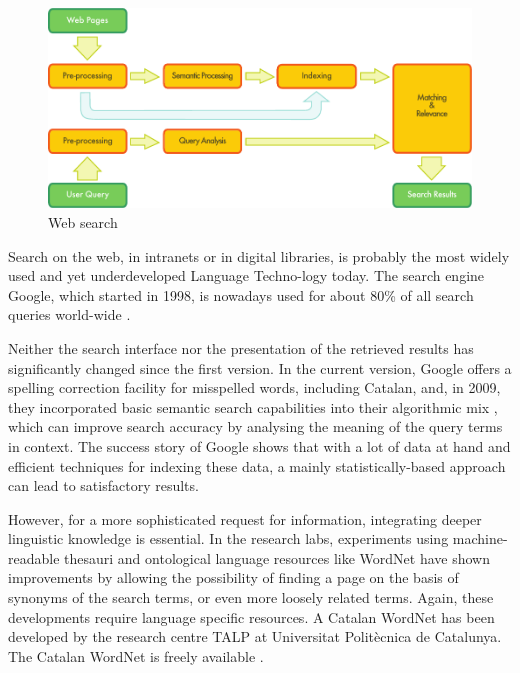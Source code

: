 \documentclass[]{../../metanetpaper}
\begin{document}
\begin{multicols}{2}
\begin{figure}[htb]
  \center
  \includegraphics[width=\textwidth]{../_media/english/web_search_architecture}
  \caption{Web search}
  \label{fig:websearcharch_en}
 \end{figure}

Search on the web, in intranets or in digital libraries, is probably the most widely used and yet underdeveloped Language Techno-logy today. The search engine Google, which started in 1998, is nowadays used for about 80\% of all search queries world-wide \cite{CAT-Nota22}. 

Neither the search interface nor the presentation of the retrieved results has significantly changed since the first version. In the current version, Google offers a spelling correction facility for misspelled words, including Catalan, and, in 2009, they incorporated basic semantic search capabilities into their algorithmic mix \cite{CAT-Nota23}, which can improve search accuracy by analysing the meaning of the query terms in context. The success story of Google shows that with a lot of data at hand and efficient techniques for indexing these data, a mainly statistically-based approach can lead to satisfactory results. 

However, for a more sophisticated request for information, integrating deeper linguistic knowledge is essential. In the research labs, experiments using machine-readable thesauri and ontological language resources like WordNet have shown improvements by allowing the possibility of finding a page on the basis of synonyms of the search terms, or even more loosely related terms. Again, these developments require language specific resources. A Catalan WordNet has been developed by the research centre TALP at Universitat Politècnica de Catalunya. The Catalan WordNet is freely available \cite{CAT-Nota24}.


\end{multicols}
\end{document}
